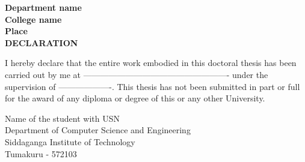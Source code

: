 \begin{center}
\bfseries
\large{Department name \\
College name \\
Place} \\
\vspace{1.5in}
\LARGE{DECLARATION} \\
\end{center}
\vspace{0.5in}
\normalsize{
I hereby declare that the entire work embodied in this doctoral thesis has been carried out by me at ---------------------------------------------------- under the supervision of -------------------. This thesis has not been submitted in part or full for the award of any diploma or degree of this or any other University.} \\
\vspace{0.5in}
\begin{flushleft}
\normalsize{Name of the student with USN} \\
Department of Computer Science and Engineering\\
Siddaganga Institute of Technology\\
Tumakuru - 572103\\
\end{flushleft}


